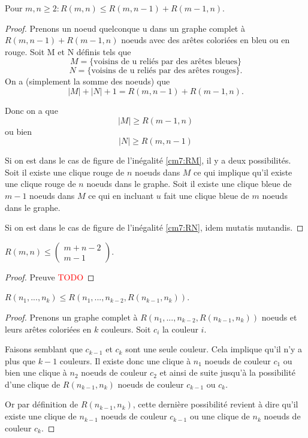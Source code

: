 \begin{mytheo} 
  Pour $m, n \geq 2: R(m, n) \leq R(m, n-1) + R(m-1, n)$.
  \begin{proof}
     Prenons un noeud quelconque u dans un graphe complet à $R(m,n-1) + R(m-1,n)$ noeuds avec des arêtes coloriées en bleu ou en rouge. Soit M et N définis tels que 
     $$M = \{ \text{voisins de u reliés par des arêtes bleues}\}$$ 
     $$N = \{ \text{voisins de u reliés par des arêtes rouges}\}.$$
 On a (simplement la somme des noeuds) que 
 $$|M|+|N|+1 = R(m,n-1) + R(m-1,n).$$ 
 
 Donc on a que  
 \begin{equation} \label{cm7:RM}
 |M| \geq R(m-1,n)
\end{equation}    
ou bien 
\begin{equation} \label{cm7:RN}
 |N| \geq R(m,n-1)
\end{equation}  

Si on est dans le cas de figure de l'inégalité \ref{cm7:RM}, il y a deux possibilités. Soit il existe une clique rouge de $n$ noeuds dans $M$ ce qui implique qu'il existe une clique rouge de $n$ noeuds dans le graphe. Soit il existe une clique bleue de $m-1$ noeuds dans $M$ ce qui en incluant $u$ fait une clique bleue de $m$ noeuds dans le graphe.

Si on est dans le cas de figure de l'inégalité \ref{cm7:RN}, idem mutatis mutandis. 
  \end{proof}
\end{mytheo}

\begin{mycorr}
  $R(m, n) \leq (
    \begin{array}{c}
      m+n-2 \\
      m-1
    \end{array})$.
  \begin{proof}
     Preuve \textcolor{red}{TODO}
  \end{proof}
\end{mycorr}

\begin{mytheo}
  $R(n_1, ..., n_k) \leq R(n_1, ..., n_{k-2}, R(n_{k-1}, n_k))$.
  \begin{proof}
  Prenons un graphe complet à $R(n_1, ..., n_{k-2}, R(n_{k-1}, n_k))$ noeuds et leurs arêtes coloriées en $k$ couleurs. Soit $c_i $ la couleur $i$.
  
  Faisons semblant que $c_{k-1}$ et $c_{k}$ sont une seule couleur. Cela implique qu'il n'y a plus que $k-1$ couleurs. Il existe donc une clique à $n_1$ noeuds de couleur $c_1$ ou bien une clique à $n_2$ noeuds de couleur $c_2$ et ainsi de suite jusqu'à la possibilité d'une clique de $R(n_{k-1}, n_k)$ noeuds de couleur $c_{k-1}$ ou $c_{k}$. 
  
  Or par définition de $R(n_{k-1}, n_k)$, cette dernière possibilité revient à dire qu'il existe une clique de $n_{k-1}$ noeuds de couleur $c_{k-1}$ ou une clique de $n_{k}$ noeuds de couleur $c_{k}$.
  \end{proof}
\end{mytheo}

